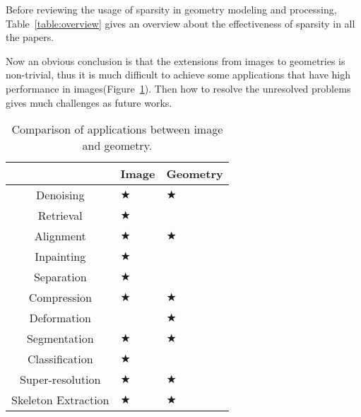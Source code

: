 Before reviewing the usage of sparsity in geometry modeling and processing, Table~\ref{table:overview} gives an overview about the effectiveness of sparsity in all the papers.



 

\vspace{15pt}
Now an obvious conclusion is that the extensions from images to geometries is non-trivial, 
thus it is much difficult to achieve some applications that have high performance in images(Figure~\ref{table:applications}).
Then how to resolve the unresolved problems gives much challenges as future works.

\begin{table}
\begin{center}
\small{
\caption{Comparison of applications between image and geometry.}

    \begin{tabular}{| c |  p{0.6in}<{\centering} |  p{0.6in}<{\centering} |}\hline
                            &   Image         &    Geometry     \\ \hline
        Denoising           &   $\bigstar$    &    $\bigstar$   \\ \hline
        Retrieval           &   $\bigstar$    &                 \\ \hline
        Alignment           &   $\bigstar$    &    $\bigstar$   \\ \hline
        Inpainting          &   $\bigstar$    &                 \\ \hline
        Separation          &   $\bigstar$    &                 \\ \hline
        Compression         &   $\bigstar$    &    $\bigstar$   \\ \hline
        Deformation         &                 &    $\bigstar$   \\ \hline
        Segmentation        &   $\bigstar$    &    $\bigstar$   \\ \hline
        Classification      &   $\bigstar$    &                 \\ \hline
        Super-resolution    &   $\bigstar$    &    $\bigstar$   \\ \hline
        Skeleton Extraction &   $\bigstar$    &    $\bigstar$   \\ \hline
    \end{tabular}
    \label{table:applications}
}
\end{center}
\end{table}